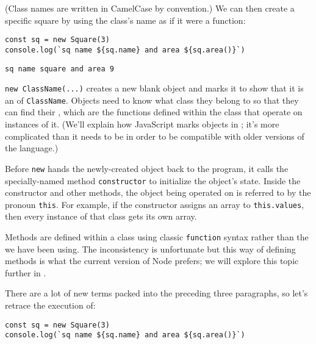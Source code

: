 \noindent
(Class names are written in CamelCase by convention.)
We can then create a specific square by using the class's name as if it were a function:

\begin{verbatim}
const sq = new Square(3)
console.log(`sq name ${sq.name} and area ${sq.area()}`)
\end{verbatim}

\begin{verbatim}
sq name square and area 9
\end{verbatim}

\texttt{new\ ClassName(...)} creates a new blank object
and marks it to show that it is an  of \texttt{ClassName}.
Objects need to know what class they belong to
so that they can find their ,
which are the functions defined within the class
that operate on instances of it.
(We'll explain how JavaScript marks objects in ;
it's more complicated than it needs to be
in order to be compatible with older versions of the language.)


Before \texttt{new} hands the newly-created object back to the program,
it calls the specially-named method \texttt{constructor} to initialize the object's state.
Inside the constructor and other methods,
the object being operated on is referred to by the pronoun \texttt{this}.
For example,
if the constructor assigns an array to \texttt{this.values},
then every instance of that class gets its own array.

Methods are defined within a class using classic \texttt{function} syntax
rather than the  we have been using.
The inconsistency is unfortunate
but this way of defining methods is what the current version of Node prefers;
we will explore this topic further in .

There are a lot of new terms packed into the preceding three paragraphs,
so let's retrace the execution of:

\begin{verbatim}
const sq = new Square(3)
console.log(`sq name ${sq.name} and area ${sq.area()}`)
\end{verbatim}


